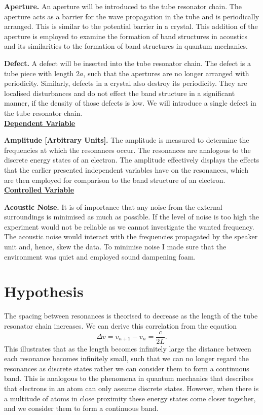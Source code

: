 \documentclass[12pt]{article}
\begin{document}
{\bf Aperture.} An aperture will be introduced to the tube resonator chain. The aperture acts as a barrier for the wave propagation in the tube and is periodically arranged. This is similar to the potential barrier in a crystal. This addition of the aperture is employed to examine the formation of band structures in acoustics and its similarities to the formation of band structures in quantum mechanics.

{\bf Defect.} A defect will be inserted into the tube resonator chain. The defect is a tube piece with length $2a$, such that the apertures are no longer arranged with periodicity. Similarly, defects in a crystal also destroy its periodicity. They are localised disturbances and do not effect the band structure in a significant manner, if the density of those defects is low. We will introduce a single defect in the tube resonator chain. \\
\underline{\bf Dependent Variable}

{\bf Amplitude [Arbitrary Units].} The amplitude is measured to determine the frequencies at which the resonances occur. The resonances are analogous to the discrete energy states of an electron. The amplitude effectively displays the effects that the earlier presented independent variables have on the resonances, which are then employed for comparison to the band structure of an electron. \\
\underline{\bf Controlled Variable}

{\bf Acoustic Noise.} It is of importance that any noise from the external surroundings is minimised as much as possible. If the level of noise is too high the experiment would not be reliable as we cannot investigate the wanted frequency. The acoustic noise would interact with the frequencies propagated by the speaker unit and, hence, skew the data. To minimise noise I made sure that the environment was quiet and employed sound dampening foam. 
\section{Hypothesis}
The spacing between resonances is theorised to decrease as the length of the tube resonator chain increases. We can derive this correlation from the eqaution
\begin{equation}
	\Delta v = v_{n+1} - v_n = \frac{c}{2L}.
\end{equation}
This illustrates that as the length becomes infinitely large the distance between each resonance becomes infinitely small, such that we can no longer regard the resonances as discrete states rather we can consider them to form a continuous band. This is analogous to the phenomena in quantum mechanics that describes that electrons in an atom can only assume discrete states. However, when there is a multitude of atoms in close proximity these energy states come closer together, and we consider them to form a continuous band.
\end{document}
